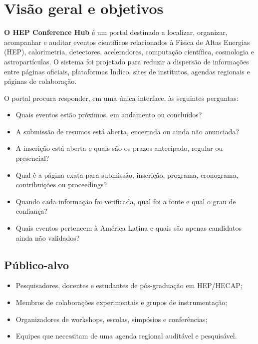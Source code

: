 \chapter{Visão geral e objetivos}

\textbf{O HEP Conference Hub }é um portal destinado a localizar, organizar, acompanhar e auditar eventos científicos relacionados à Física de Altas Energias (HEP), calorimetria, detectores, aceleradores, computação científica, cosmologia e astropartículas. O sistema foi projetado para reduzir a dispersão de informações entre páginas oficiais, plataformas Indico, sites de institutos, agendas regionais e páginas de colaboração.

O portal procura responder, em uma única interface, às seguintes perguntas:

\begin{itemize}[leftmargin=*,itemsep=0.25em]
\item Quais eventos estão próximos, em andamento ou concluídos?
\item A submissão de resumos está aberta, encerrada ou ainda não anunciada?
\item A inscrição está aberta e quais são os prazos antecipado, regular ou presencial?
\item Qual é a página exata para submissão, inscrição, programa, cronograma, contribuições ou proceedings?
\item Quando cada informação foi verificada, qual foi a fonte e qual o grau de confiança?
\item Quais eventos pertencem à América Latina e quais são apenas candidatos ainda não validados?
\end{itemize}

\section{Público-alvo}

\begin{itemize}[leftmargin=*,itemsep=0.25em]
\item Pesquisadores, docentes e estudantes de pós-graduação em HEP/HECAP;
\item Membros de colaborações experimentais e grupos de instrumentação;
\item Organizadores de workshops, escolas, simpósios e conferências;
\item Equipes que necessitam de uma agenda regional auditável e pesquisável.
\end{itemize}

